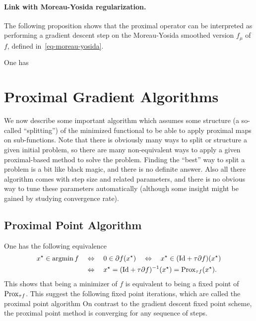 \paragraph{Link with Moreau-Yosida regularization.}

The following proposition shows that the proximal operator can be interpreted as performing a gradient descent step on the Moreau-Yosida smoothed version $f_\mu$ of $f$, defined in~\eqref{eq-moreau-yosida}.

\begin{prop}
	One has
\end{prop}


\section{Proximal Gradient Algorithms}

We now describe some important algorithm which assumes some structure (a so-called ``splitting'') of the minimized functional to be able to apply proximal maps on sub-functions.
%
Note that there is obviously many ways to split or structure a given initial problem, so there are many non-equivalent ways to apply a given proximal-based method to solve the problem. Finding the ``best'' way to split a problem is a bit like black magic, and there is no definite answer.
%
Also all there algorithm comes with step size and related parameters, and there is no obvious way to tune these parameters automatically (although some insight might be gained by studying convergence rate).

\subsection{Proximal Point Algorithm}

One has the following equivalence 
\begin{align}\label{eq-proxpoint-fix}
	x^\star \in \operatorname{argmin} f
	&\quad\Leftrightarrow\quad
	0 \in \partial f(x^\star)
	\quad\Leftrightarrow\quad
	x^\star \in (\mathrm{Id}+\tau \partial f)(x^\star) \\
	&\quad\Leftrightarrow\quad
	x^\star = (\mathrm{Id}+\tau \partial f)^{-1}(x^\star) = \operatorname{Prox}_{\tau f}(x^\star).
\end{align}
This shows that being a minimizer of $f$ is equivalent to being a fixed point of $\operatorname{Prox}_{\tau f}$.
%
This suggest the following fixed point iterations, which are called the proximal point algorithm 
On contrast to the gradient descent fixed point scheme, the proximal point method is converging for any sequence of steps.

